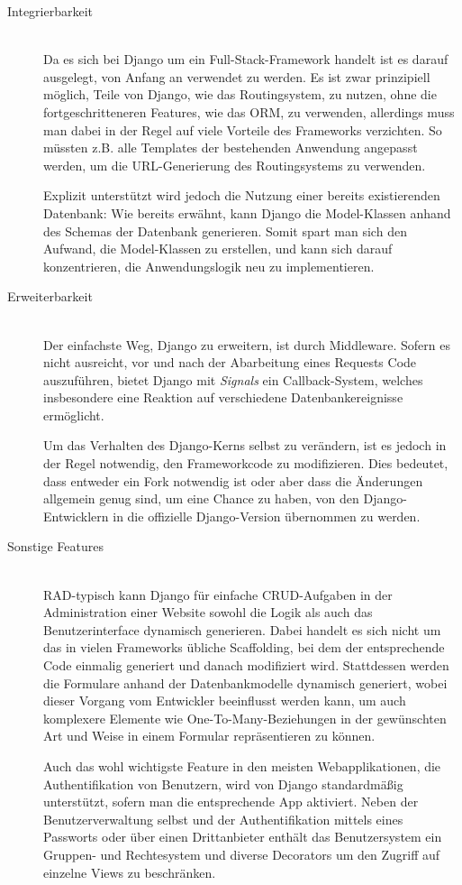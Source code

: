 \begin{description}
\item[Integrierbarkeit] \hfill \\
Da es sich bei Django um ein Full-Stack-Framework handelt ist es darauf ausgelegt, von Anfang an
verwendet zu werden. Es ist zwar prinzipiell möglich, Teile von Django, wie das Routingsystem, zu
nutzen, ohne die fortgeschritteneren Features, wie das ORM, zu verwenden, allerdings muss man dabei
in der Regel auf viele Vorteile des Frameworks verzichten. So müssten z.B. alle Templates der
bestehenden Anwendung angepasst werden, um die URL-Generierung des Routingsystems zu verwenden.

Explizit unterstützt wird jedoch die Nutzung einer bereits existierenden Datenbank: Wie bereits
erwähnt, kann Django die Model-Klassen anhand des Schemas der Datenbank generieren. Somit spart man
sich den Aufwand, die Model-Klassen zu erstellen, und kann sich darauf konzentrieren, die
Anwendungslogik neu zu implementieren.


\item[Erweiterbarkeit] \hfill \\
Der einfachste Weg, Django zu erweitern, ist durch Middleware. Sofern es nicht ausreicht,
vor und nach der Abarbeitung eines Requests Code auszuführen, bietet Django mit \emph{Signals} ein
Callback-System, welches insbesondere eine Reaktion auf verschiedene Datenbankereignisse ermöglicht.

Um das Verhalten des Django-Kerns selbst zu verändern, ist es jedoch in der Regel notwendig, den
Frameworkcode zu modifizieren. Dies bedeutet, dass entweder ein Fork notwendig ist oder aber dass
die Änderungen allgemein genug sind, um eine Chance zu haben, von den Django-Entwicklern in die
offizielle Django-Version übernommen zu werden.


\item[Sonstige Features] \hfill \\
RAD-typisch kann Django für einfache CRUD-Aufgaben in der Administration einer Website sowohl die
Logik als auch das Benutzerinterface dynamisch generieren. Dabei handelt es sich nicht um das
in vielen Frameworks übliche Scaffolding, bei dem der entsprechende Code einmalig generiert und
danach modifiziert wird. Stattdessen werden die Formulare anhand der Datenbankmodelle
dynamisch generiert, wobei dieser Vorgang vom Entwickler beeinflusst werden kann, um auch komplexere
Elemente wie One-To-Many-Beziehungen in der gewünschten Art und Weise in einem Formular
repräsentieren zu können.

Auch das wohl wichtigste Feature in den meisten Webapplikationen, die Authentifikation von
Benutzern, wird von Django standardmäßig unterstützt, sofern man die entsprechende App aktiviert.
Neben der Benutzerverwaltung selbst und der Authentifikation mittels eines Passworts oder über einen
Drittanbieter enthält das Benutzersystem ein Gruppen- und Rechtesystem und diverse Decorators um den
Zugriff auf einzelne Views zu beschränken.



\end{description}
